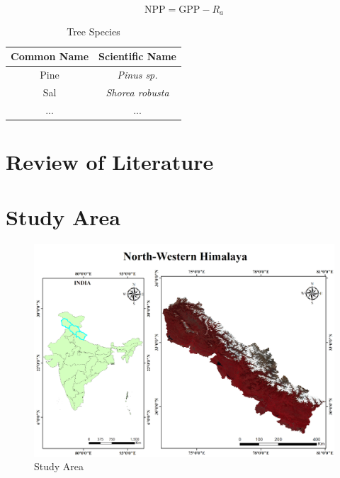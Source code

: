 \documentclass[12pt,a4paper]{report}%
\begin{document}
\begin{equation}
    \text{NPP} = \text{GPP} - R_a
\end{equation}
\label{eq:NPP}



\begin{table}[h!]
\centering
\begin{tabular}{||c c||} 
 \hline
 Common Name & Scientific Name \\ [0.5ex] 
 \hline\hline
 Pine & \textit{Pinus sp.} \\ 
 Sal & \textit{Shorea robusta} \\
 ... & ... \\ [1ex] 
 \hline
\end{tabular}
\caption{Tree Species}
\label{table:species}
\end{table}


\chapter{Review of Literature}



\chapter{Study Area}
\begin{figure}
\centering
\includegraphics[width=15cm]{photos/NWH_Ph.png}
\caption{Study Area}
\label{fig: North Western Himalaya}
\end{figure}
\end{document}
